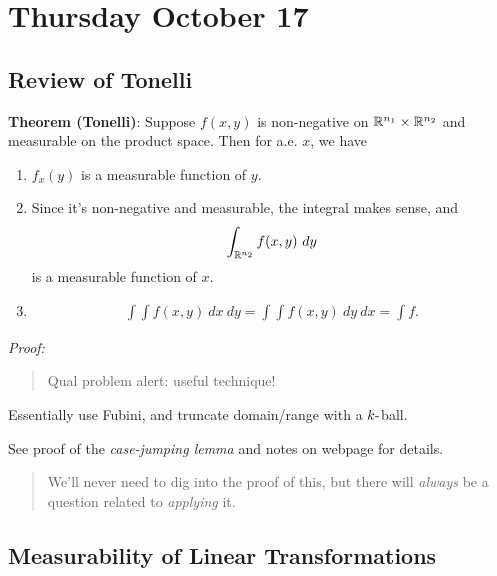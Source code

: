 \hypertarget{thursday-october-17}{%
\section{Thursday October 17}\label{thursday-october-17}}

\hypertarget{review-of-tonelli}{%
\subsection{Review of Tonelli}\label{review-of-tonelli}}

\textbf{Theorem (Tonelli)}: Suppose \(f(x, y)\) is non-negative on
\({\mathbb{R}}^{n_1} \times {\mathbb{R}}^{n_2}\) and measurable on the product space. Then
for a.e. \(x\), we have

\begin{enumerate}
\def\labelenumi{\arabic{enumi}.}
\item
  \(f_x(y)\) is a measurable function of \(y\).
\item
  Since it's non-negative and measurable, the integral makes sense, and
  \begin{align*}
  \int_{{\mathbb{R}}^{n_2}} f(x, y) ~dy
  \end{align*} is a measurable function of \(x\).
\item

  \begin{align*}
  \int\int f(x,y) ~dx ~dy = \int\int f(x,y) ~dy~dx = \int f
  .\end{align*}
\end{enumerate}

\emph{Proof:}

\begin{quote}
Qual problem alert: useful technique!
\end{quote}

Essentially use Fubini, and truncate domain/range with a \(k{\hbox{-}}\)ball.

See proof of the \emph{case-jumping lemma} and notes on webpage for
details.

\begin{quote}
We'll never need to dig into the proof of this, but there will
\emph{always} be a question related to \emph{applying} it.
\end{quote}

\hypertarget{measurability-of-linear-transformations}{%
\subsection{Measurability of Linear
Transformations}\label{measurability-of-linear-transformations}}

